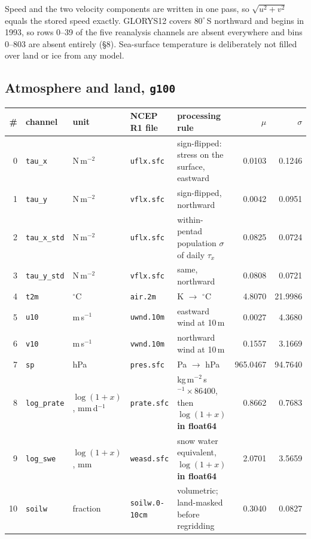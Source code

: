 \documentclass[10pt]{article}
\newcommand{\code}[1]{\texttt{#1}}
\begin{document}
Speed and the two velocity components are written in one pass, so
$\sqrt{u^2+v^2}$ equals the stored speed exactly. GLORYS12 covers
$80^\circ$\,S northward and begins in 1993, so rows 0--39 of the five
reanalysis channels are absent everywhere and bins 0--803 are absent entirely
(\S8). Sea-surface temperature is deliberately not filled over land or ice
from any model.

\subsection{Atmosphere and land, \code{g100}}

\begin{table}[h]
\centering\setlength{\tabcolsep}{4pt}\footnotesize
\begin{tabular}{@{}rl>{\raggedright\arraybackslash}p{2.1cm}>{\raggedright\arraybackslash}p{2.1cm}>{\raggedright\arraybackslash}p{4.6cm}rr@{}}
\toprule
\# & channel & unit & NCEP R1 file & processing rule & $\mu$ & $\sigma$ \\
\midrule
0 & \code{tau\_x} & N\,m$^{-2}$ & \code{uflx.sfc} & sign-flipped: stress on the surface, eastward & 0.0103 & 0.1246 \\
1 & \code{tau\_y} & N\,m$^{-2}$ & \code{vflx.sfc} & sign-flipped, northward & 0.0042 & 0.0951 \\
2 & \code{tau\_x\_std} & N\,m$^{-2}$ & \code{uflx.sfc} & within-pentad population $\sigma$ of daily $\tau_x$ & 0.0825 & 0.0724 \\
3 & \code{tau\_y\_std} & N\,m$^{-2}$ & \code{vflx.sfc} & same, northward & 0.0808 & 0.0721 \\
4 & \code{t2m} & $^\circ$C & \code{air.2m} & K $\to$ $^\circ$C & 4.8070 & 21.9986 \\
5 & \code{u10} & m\,s$^{-1}$ & \code{uwnd.10m} & eastward wind at 10\,m & 0.0027 & 4.3680 \\
6 & \code{v10} & m\,s$^{-1}$ & \code{vwnd.10m} & northward wind at 10\,m & 0.1557 & 3.1669 \\
7 & \code{sp} & hPa & \code{pres.sfc} & Pa $\to$ hPa & 965.0467 & 94.7640 \\
8 & \code{log\_prate} & $\log(1{+}x)$, mm\,d$^{-1}$ & \code{prate.sfc} & kg\,m$^{-2}$\,s$^{-1}\times86400$, then $\log(1+x)$ \textbf{in float64} & 0.8662 & 0.7683 \\
9 & \code{log\_swe} & $\log(1{+}x)$, mm & \code{weasd.sfc} & snow water equivalent, $\log(1+x)$ \textbf{in float64} & 2.0701 & 3.5659 \\
10 & \code{soilw} & fraction & \code{soilw.0-10cm} & volumetric; land-masked before regridding & 0.3040 & 0.0827 \\

\end{tabular}
\end{table}
\end{document}
